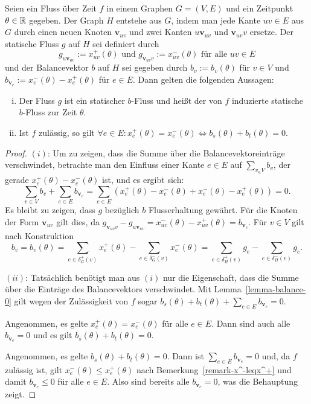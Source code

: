 \newcommand{\newv}{\mathbf{v}}
\begin{lemma}\label{lemma-b-graph}
	Seien ein Fluss über Zeit $f$ in einem Graphen $G=(V,E)$ und ein Zeitpunkt $\theta\in\mathbb{R}$ gegeben.
	Der Graph $H$ entstehe aus $G$, indem man jede Kante $uv\in E$ aus $G$ durch einen neuen Knoten $\newv_{uv}$ und zwei Kanten $u\newv_{uv}$ und $\newv_{uv}v$ ersetze.
	Der statische Fluss $g$ auf $H$ sei definiert durch
	$$g_{u\newv_{uv}} := x_{uv}^+(\theta) \text{ und } g_{\newv_{uv}v} := x_{uv}^-(\theta) \text{ für alle $uv\in E$}$$
	und der Balancevektor $b$ auf $H$ sei gegeben durch $b_v:= b_v(\theta)$ für $v\in V$ und $b_{\newv_e}:= x_e^-(\theta) - x_e^+(\theta)$ für $e\in E$.
	Dann gelten die folgenden Aussagen:
	
	\begin{enumerate}[(i)]
		\item Der Fluss $g$ ist ein statischer $b$-Fluss und heißt der von $f$ induzierte statische $b$-Fluss zur Zeit $\theta$.
		\item\label{lemma-b-graph-imp} Ist $f$ zulässig, so gilt $\forall e\in E : x_e^+(\theta) = x_e^-(\theta)\iff b_s(\theta) + b_t(\theta) = 0$.
	\end{enumerate}
\end{lemma} 
\begin{proof}
	$(i)$: Um zu zeigen, dass die Summe über die Balancevektoreinträge verschwindet, betrachte man den Einfluss einer Kante $e\in E$ auf $\sum_{v_\in V} b_v$, der gerade $x_e^+(\theta) - x_e^-(\theta)$ ist, und es ergibt sich:
		$$\sum_{v\in V}b_v + \sum_{e\in E} b_{\newv_e} = \sum_{e\in E}  (x_e^+(\theta) - x_e^-(\theta) + x_e^-(\theta) - x_e^+(\theta)) = 0.$$
		Es bleibt zu zeigen, dass $g$ bezüglich $b$ Flusserhaltung gewährt.
		Für die Knoten der Form $\newv_{uv}$ gilt dies, da $g_{\newv_{uv}v} - g_{u\newv_{uv}} = x_{uv}^-(\theta) - x_{uv}^+(\theta) = b_{\newv_e}$.
		Für $v\in V$ gilt nach Konstruktion $$b_v = b_v(\theta)=
		\sum_{e\in\delta^+_G(v)} x_{e}^+(\theta) - \sum_{e\in\delta^-_G(v)} x_{e}^-(\theta) =
	\sum_{e\in\delta_H^+(v)} g_e - \sum_{e\in\delta^-_H(v)}g_e
		.$$
	
	$(ii)$: Tatsächlich benötigt man aus $(i)$ nur die Eigenschaft, dass die Summe über die Einträge des Balancevektors verschwindet.
	Mit Lemma~\ref{lemma-balance-0} gilt wegen der Zulässigkeit von $f$ sogar $b_s(\theta)+b_t(\theta) + \sum_{e\in E} b_{\newv_e} = 0$.
	
	Angenommen, es gelte $x_e^+(\theta) = x_e^-(\theta)$ für alle $e\in E$.
	Dann sind auch alle $b_{\newv_e} = 0$ und es gilt $b_s(\theta) + b_t(\theta) = 0$.
	
	Angenommen, es gelte $b_s(\theta) + b_t(\theta) = 0$.
	Dann ist $\sum_{e\in E} b_{\newv_e} = 0$ und, da $f$ zulässig ist, gilt $x_e^-(\theta)\leq x_e^+(\theta)$ nach Bemerkung~\ref{remark-x^-leqx^+}   und damit $b_{\newv_e}\leq 0$ für alle $e\in E$.
	Also sind bereits alle $b_{\newv_e} = 0$, was die Behauptung zeigt.
\end{proof}


